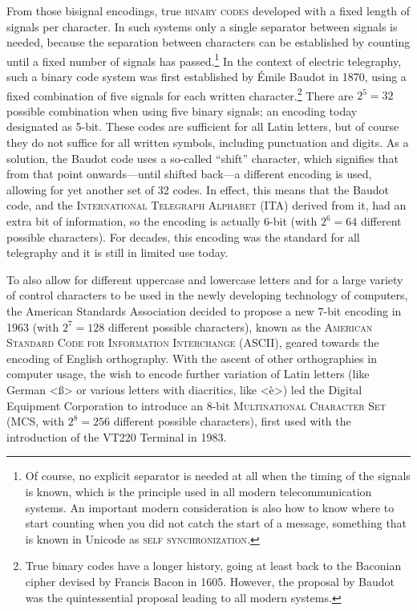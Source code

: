 From those bisignal encodings, true \textsc{binary codes} developed with a fixed
length of signals per character. In such systems only a single separator between
signals is needed, because the separation between characters can be established
by counting until a fixed number of signals has passed.\footnote{Of course, no
explicit separator is needed at all when the timing of the signals is known, which is
the principle used in all modern telecommunication systems. An important modern
consideration is also how to know where to start counting when you did not catch
the start of a message, something that is known in Unicode as \textsc{self
synchronization}.} In the context of electric telegraphy, such a binary code
system was first established by Émile Baudot in 1870, using a fixed combination
of five signals for each written character.\footnote{True binary codes have a
longer history, going at least back to the Baconian cipher devised by Francis
Bacon in 1605. However, the proposal by Baudot was the quintessential proposal
leading to all modern systems.} There are $2^5 = 32$ possible combination when
using five binary signals; an encoding today designated as 5-bit. These
codes are sufficient for all Latin letters, but of course they do not suffice
for all written symbols, including punctuation and digits. As a solution, the
Baudot code uses a so-called ``shift'' character, which signifies that from
that point onwards---until shifted back---a different encoding is used, allowing
for yet another set of 32 codes. In effect, this means that the Baudot code, and
the \textsc{International Telegraph Alphabet} (ITA) derived from it, had an
extra bit of information, so the encoding is actually 6-bit (with $2^6
= 64$ different possible characters). For decades, this encoding was the
standard for all telegraphy and it is still in limited use today.

To also allow for different uppercase and lowercase letters and for a large
variety of control characters to be used in the newly developing technology of
computers, the American Standards Association decided to propose a new 7-bit
encoding in 1963 (with $2^7 = 128$ different possible characters), known as the
\textsc{American Standard Code for Information Interchange} (ASCII), geared
towards the encoding of English orthography. With the ascent of other
orthographies in computer usage, the wish to encode further variation of Latin
letters (like German <ß> or various letters with diacritics, like <è>) led the
Digital Equipment Corporation to introduce an 8-bit \textsc{Multinational
Character Set} (MCS, with $2^8 = 256$ different possible characters), first used
with the introduction of the VT{\large 220} Terminal in 1983. 

